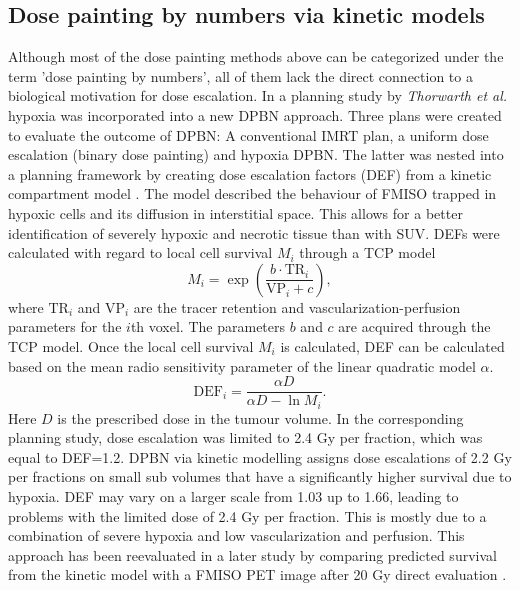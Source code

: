 \subsection{Dose painting by numbers via kinetic models}
Although most of the dose painting methods above can be categorized under the term 'dose painting by numbers', all of them lack the direct connection to a biological motivation for dose escalation. In a planning study by \textit{Thorwarth et al.} \cite{pmid17448882} hypoxia was incorporated into a new DPBN approach. Three plans were created to evaluate the outcome of DPBN: A conventional IMRT plan, a uniform dose escalation (binary dose painting) and hypoxia DPBN. The latter was nested into a planning framework by creating dose escalation factors (DEF) from a kinetic compartment model \cite{pmid15876662}. The model described the behaviour of FMISO trapped in hypoxic cells and its diffusion in interstitial space. This allows for a better identification of severely hypoxic and necrotic tissue than with SUV. DEFs were calculated with regard to local cell survival $M_i$ through a TCP model \cite{pmid16321146}
\begin{equation}
M_i = \exp\left(\frac{b\cdot \mathrm{TR}_i}{\mathrm{VP}_i+c}\right),
\end{equation}
where $\mathrm{TR}_i$ and $\mathrm{VP}_i$ are the tracer retention and vascularization-perfusion parameters for the $i$th voxel. The parameters $b$ and $c$ are acquired through the TCP model. Once the local cell survival $M_i$ is calculated, DEF can be calculated based on the mean radio sensitivity parameter of the linear quadratic model $\alpha$.
\begin{equation}
\mathrm{DEF}_i = \frac{\alpha D}{\alpha D - \ln M_i}.
\end{equation}
Here $D$ is the prescribed dose in the tumour volume. In the corresponding planning study, dose escalation was limited to 2.4 Gy per fraction, which was equal to DEF=1.2. DPBN via kinetic modelling assigns dose escalations of 2.2 Gy per fractions on small sub volumes that have a significantly higher survival due to hypoxia. DEF may vary on a larger scale from 1.03 up to 1.66, leading to problems with the limited dose of 2.4 Gy per fraction. This is mostly due to a combination of severe hypoxia and low vascularization and perfusion. This approach has been reevaluated in a later study by comparing predicted survival from the kinetic model with a FMISO PET image after 20 Gy direct evaluation \cite{pmid18524387}.
